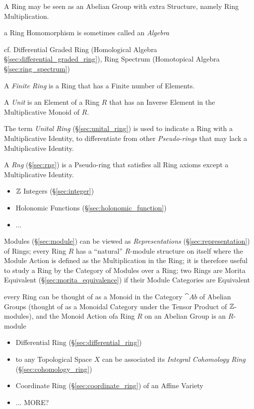 A Ring may be seen as an Abelian Group with extra Structure, namely Ring
Multiplication.

a Ring Homomorphism is sometimes called an \emph{Algebra}

cf. Differential Graded Ring (Homological Algebra
\S\ref{sec:differential_graded_ring}), Ring Spectrum (Homotopical Algebra
\S\ref{sec:ring_spectrum})

A \emph{Finite Ring} is a Ring that has a Finite number of Elements.

A \emph{Unit} is an Element of a Ring $R$ that has an Inverse
Element in the Multiplicative Monoid of $R$.

The term \emph{Unital Ring} (\S\ref{sec:unital_ring}) is used to
indicate a Ring with a Multiplicative Identity, to differentiate from
other \emph{Pseudo-rings} that may lack a Multiplicative Identity.

A \emph{Rng} (\S\ref{sec:rng}) is a Pseudo-ring that satisfies all
Ring axioms except a Multiplicative Identity.

\begin{itemize}
  \item $\mathbb{Z}$ Integers (\S\ref{sec:integer})
  \item Holonomic Functions (\S\ref{sec:holonomic_function})
  \item ...
\end{itemize}

\fist Modules (\S\ref{sec:module}) can be viewed as \emph{Representations}
(\S\ref{sec:representation}) of Rings; every Ring $R$ has a ``natural''
$R$-module structure on itself where the Module Action is defined as the
Multiplication in the Ring; it is therefore useful to study a Ring by the
Category of Modules over a Ring; two Rings are Morita Equivalent
(\S\ref{sec:morita_equivalence}) if their Module Categories are Equivalent

every Ring can be thought of as a Monoid in the Category $\cat{Ab}$ of Abelian
Groups (thought of as a Monoidal Category under the Tensor Product of
$\mathbb{Z}$-modules), and the Monoid Action ofa Ring $R$ on an Abelian Group is an
$R$-module

\begin{itemize}
  \item Differential Ring (\S\ref{sec:differential_ring})
  \item to any Topological Space $X$ can be associated its \emph{Integral
    Cohomology Ring} (\S\ref{sec:cohomology_ring})
  \item Coordinate Ring (\S\ref{sec:coordinate_ring}) of an Affine Variety
  \item ... MORE?
\end{itemize}

